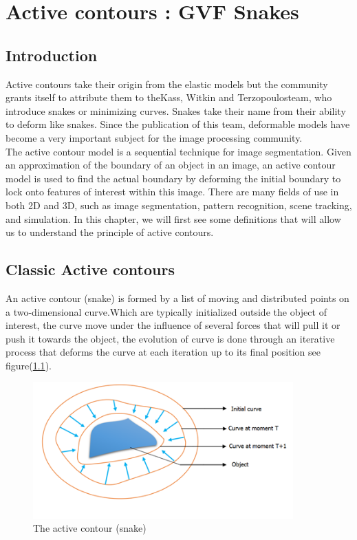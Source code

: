 
\chapter{Active contours : GVF Snakes}\label{ch:active-contours-:-gvf-snakes}
\chead{}
\lhead{\bfseries \chaptername {\,} \thechapter }
\cfoot{\bfseries \thepage}
\rhead{}

\section{Introduction}\label{sec:introduction-ch2}
Active contours take their origin from the elastic models but the
community grants itself to attribute them to theKass, Witkin and
Terzopoulosteam, \cite{2.1} who introduce snakes or minimizing curves. Snakes take
their name from their ability to deform like snakes. Since the publication of this
team, deformable models have become a very important subject for the image
processing community.\\
The active contour model is a sequential technique for image segmentation.
Given an approximation of the boundary of an object in an image, an active
contour model is used to find the actual boundary by deforming the initial
boundary to lock onto features of interest within this image. There are many
fields of use in both 2D and 3D, such as image segmentation, pattern
recognition, scene tracking, and simulation. In this chapter, we will first see
some definitions that will allow us to understand the principle of active
contours.

\section{Classic Active contours}\label{sec:classic-active-contours}

An active contour (snake) is formed by a list of moving and distributed points
on a two-dimensional curve.Which are typically initialized outside the object of
interest, the curve move under the influence of several forces that will pull it or
push it towards the object, the evolution of curve is done through an iterative
process that deforms the curve at each iteration up to its final position see figure(\ref{fig:figure1}).

\begin{figure}[h]
        \centering
        \includegraphics[width=10cm]{chapiter2/figures/Figure 01 the active contour (snake).png}
        \caption{The active contour (snake)}\label{fig:figure1}
\end{figure}
\vspace{1cm}

